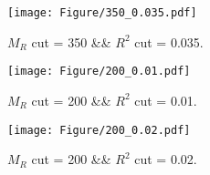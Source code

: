  
\begin{figure}[H] 
\begin{center} 
\texttt{[image: Figure/350\_0.035.pdf]} 
\caption{$M_R$ cut = 350 \&\& $R^2$ cut = 0.035.} 
\label{Fig:350_0.035} 
\end{center} 
\end{figure} 
 
 
\begin{figure}[H] 
\begin{center} 
\texttt{[image: Figure/200\_0.01.pdf]} 
\caption{$M_R$ cut = 200 \&\& $R^2$ cut = 0.01.} 
\label{Fig:200_0.01} 
\end{center} 
\end{figure} 
 
 
\begin{figure}[H] 
\begin{center} 
\texttt{[image: Figure/200\_0.02.pdf]} 
\caption{$M_R$ cut = 200 \&\& $R^2$ cut = 0.02.} 
\label{Fig:200_0.02} 
\end{center} 
\end{figure} 
 
 
